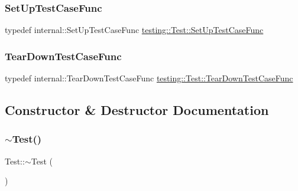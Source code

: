 \subsubsection{\texorpdfstring{SetUpTestCaseFunc}{SetUpTestCaseFunc}}
{\footnotesize\ttfamily typedef internal\+::\+Set\+Up\+Test\+Case\+Func \mbox{\hyperlink{classtesting_1_1_test_a5f2a051d1d99c9b784c666c586186cf9}{testing\+::\+Test\+::\+Set\+Up\+Test\+Case\+Func}}}

\mbox{\label{classtesting_1_1_test_aa0f532e93b9f3500144c53f31466976c}} 
\subsubsection{\texorpdfstring{TearDownTestCaseFunc}{TearDownTestCaseFunc}}
{\footnotesize\ttfamily typedef internal\+::\+Tear\+Down\+Test\+Case\+Func \mbox{\hyperlink{classtesting_1_1_test_aa0f532e93b9f3500144c53f31466976c}{testing\+::\+Test\+::\+Tear\+Down\+Test\+Case\+Func}}}



\subsection{Constructor \& Destructor Documentation}
\mbox{\label{classtesting_1_1_test_a2b0a62f1e667bbe8d8cb18d785bfa991}} 
\subsubsection{\texorpdfstring{$\sim$Test()}{~Test()}\hspace{0.1cm}{\footnotesize\ttfamily [1/3]}}
{\footnotesize\ttfamily Test\+::$\sim$\+Test (\begin{DoxyParamCaption}{ }\end{DoxyParamCaption})\hspace{0.3cm}{\ttfamily [virtual]}}

\mbox{\label{classtesting_1_1_test_a99f2bbfac6c95612322b0f10e607ebe5}} 
